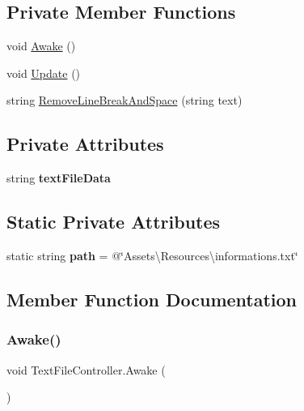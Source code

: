 \subsection*{Private Member Functions}
\begin{DoxyCompactItemize}
\item 
void \mbox{\hyperlink{class_text_file_controller_ad5cde0aa3de654e59c321a3daa258f31}{Awake}} ()
\item 
void \mbox{\hyperlink{class_text_file_controller_a1af98165daca71ad66b947454666f98e}{Update}} ()
\item 
string \mbox{\hyperlink{class_text_file_controller_ad839df8c252d9e12d5ae7b92d250ae81}{Remove\+Line\+Break\+And\+Space}} (string text)
\end{DoxyCompactItemize}
\subsection*{Private Attributes}
\begin{DoxyCompactItemize}
\item 
\mbox{\label{class_text_file_controller_a375e71c91c711ba2e45f13649d190d03}} 
string {\bfseries text\+File\+Data}
\end{DoxyCompactItemize}
\subsection*{Static Private Attributes}
\begin{DoxyCompactItemize}
\item 
\mbox{\label{class_text_file_controller_a137594f1ab900564d436c1e0a0dc3062}} 
static string {\bfseries path} = @\char`\"{}Assets\textbackslash{}\+Resources\textbackslash{}informations.\+txt\char`\"{}
\end{DoxyCompactItemize}


\subsection{Member Function Documentation}
\mbox{\label{class_text_file_controller_ad5cde0aa3de654e59c321a3daa258f31}} 
\subsubsection{\texorpdfstring{Awake()}{Awake()}}
{\footnotesize\ttfamily void Text\+File\+Controller.\+Awake (\begin{DoxyParamCaption}{ }\end{DoxyParamCaption})\hspace{0.3cm}{\ttfamily [private]}}

